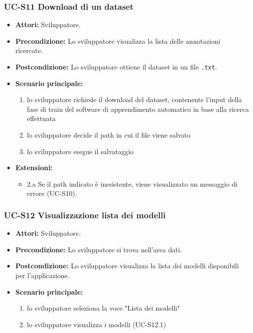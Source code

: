 	\subsubsection{UC-S11 Download di un dataset}
		\begin{itemize}
			\item \textbf{Attori:} Sviluppatore.
			\item \textbf{Precondizione:} Lo sviluppatore visualizza la lista delle annotazioni ricercate.
			\item \textbf{Postcondizione:} Lo sviluppatore ottiene il dataset in un file \texttt{.txt}.
			\item \textbf{Scenario principale:}
			\begin{enumerate}
				\item lo sviluppatore richiede il download del dataset, contenente l'input della fase di train del software di apprendimento automatico in base alla ricerca effettuata
				\item lo sviluppatore decide il path in cui il file viene salvato
				\item lo sviluppatore esegue il salvataggio
			\end{enumerate}
			\item \textbf{Estensioni:}
				\begin{itemize}
					\item 2.a Se il path indicato è inesistente, viene visualizzato un messaggio di errore (UC-S10).
				\end{itemize}
		\end{itemize}
		
	\subsubsection{UC-S12 Visualizzazione lista dei modelli}
		\begin{itemize}
			\item \textbf{Attori:} Sviluppatore.
			\item \textbf{Precondizione:} Lo sviluppatore si trova nell'area dati.
			\item \textbf{Postcondizione:} Lo sviluppatore visualizza la lista dei modelli disponibili per l'applicazione.
			\item \textbf{Scenario principale:}
			\begin{enumerate}
					\item lo sviluppatore seleziona la voce "Lista dei modelli"
					\item lo sviluppatore visualizza i modelli (UC-S12.1)
				\end{enumerate}
		\end{itemize}	
		
